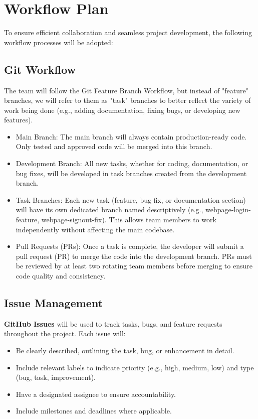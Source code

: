 \documentclass{article}
\begin{document}
\section{Workflow Plan}

To ensure efficient collaboration and seamless project development, the following workflow processes will be adopted:

\subsection{Git Workflow}
The team will follow the Git Feature Branch Workflow, but instead of "feature" branches, we will refer to them as "task" branches to better reflect the variety of work being done (e.g., adding documentation, fixing bugs, or developing new features).

\begin{itemize}
    \item Main Branch: The main branch will always contain production-ready code. Only tested and approved code will be merged into this branch.
    \item Development Branch: All new tasks, whether for coding, documentation, or bug fixes, will be developed in task branches created from the development branch.
    \item Task Branches: Each new task (feature, bug fix, or documentation section) will have its own dedicated branch named descriptively (e.g., webpage-login-feature, webpage-signout-fix). This allows team members to work independently without affecting the main codebase.
    \item Pull Requests (PRs): Once a task is complete, the developer will submit a pull request (PR) to merge the code into the development branch. PRs must be reviewed by at least two rotating team members before merging to ensure code quality and consistency.
\end{itemize}

\subsection{Issue Management}
\textbf{GitHub Issues} will be used to track tasks, bugs, and feature requests throughout the project. Each issue will:
\begin{itemize}
    \item Be clearly described, outlining the task, bug, or enhancement in detail.
    \item Include relevant labels to indicate priority (e.g., high, medium, low) and type (bug, task, improvement).
    \item Have a designated assignee to ensure accountability.
    \item Include milestones and deadlines where applicable.
\end{itemize}\par
\end{document}
